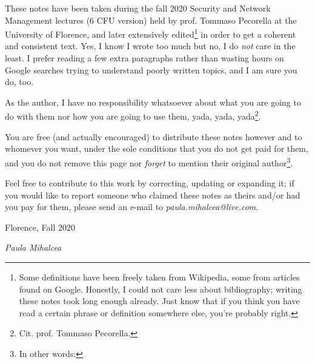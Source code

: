 \documentclass[
12pt, %
english, %
singlespacing, %
headsepline, %
]{notes_class} %
\begin{document}

\begin{declaration}

These notes have been taken during the fall 2020 Security and Network Management lectures (6 CFU version) held by prof. Tommaso Pecorella at the University of Florence, and later extensively edited\footnote{Some definitions have been freely taken from Wikipedia, some from articles found on Google. Honestly, I could not care less about bibliography; writing these notes took long enough already. Just know that if you think you have read a certain phrase or definition somewhere else, you're probably right.} in order to get a coherent and consistent text. Yes, I know I wrote too much but no, I do \textit{not} care in the least. I prefer reading a few extra paragraphs rather than wasting hours on Google searches trying to understand poorly written topics, and I am sure you do, too.

As the author, I have no responsibility whatsoever about what you are going to do with them nor how you are going to use them, yada, yada, yada\footnote{Cit. prof. Tommaso Pecorella.}.

You are free (and actually encouraged) to distribute these notes however and to whomever you want, under the sole conditions that you do not get paid for them, and you do not remove this page nor \textit{forget} to mention their original author\footnote{In other words: \doclicenseThis}.

Feel free to contribute to this work by correcting, updating or expanding it; if you would like to report someone who claimed these notes as theirs and/or had you pay for them, please send an e-mail to \textit{paula.mihalcea@live.com}.

\begin{flushright}
Florence, Fall 2020

\textit{Paula Mihalcea}
\end{flushright}

\end{declaration}

\cleardoublepage

\end{document}

